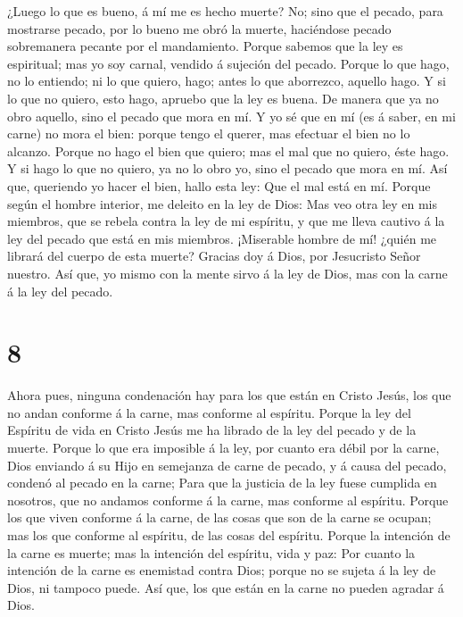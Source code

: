  ¿Luego lo que es bueno, á mí me es hecho muerte? No; sino
que el pecado, para mostrarse pecado, por lo bueno me obró la muerte,
haciéndose pecado sobremanera pecante por el mandamiento. 
Porque sabemos que la ley es espiritual; mas yo soy carnal, vendido á
sujeción del pecado.  Porque lo que hago, no lo entiendo;
ni lo que quiero, hago; antes lo que aborrezco, aquello hago.
 Y si lo que no quiero, esto hago, apruebo que la ley es
buena.  De manera que ya no obro aquello, sino el pecado
que mora en mí.  Y yo sé que en mí (es á saber, en mi
carne) no mora el bien: porque tengo el querer, mas efectuar el bien no
lo alcanzo.  Porque no hago el bien que quiero; mas el mal
que no quiero, éste hago.  Y si hago lo que no quiero, ya
no lo obro yo, sino el pecado que mora en mí.  Así que,
queriendo yo hacer el bien, hallo esta ley: Que el mal está en mí.
 Porque según el hombre interior, me deleito en la ley de
Dios:  Mas veo otra ley en mis miembros, que se rebela
contra la ley de mi espíritu, y que me lleva cautivo á la ley del pecado
que está en mis miembros.  ¡Miserable hombre de mí! ¿quién
me librará del cuerpo de esta muerte?  Gracias doy á Dios,
por Jesucristo Señor nuestro. Así que, yo mismo con la mente sirvo á la
ley de Dios, mas con la carne á la ley del pecado.

\hypertarget{section-7}{%
\section{8}\label{section-7}}

 Ahora pues, ninguna condenación hay para los que están en
Cristo Jesús, los que no andan conforme á la carne, mas conforme al
espíritu.  Porque la ley del Espíritu de vida en Cristo
Jesús me ha librado de la ley del pecado y de la muerte. 
Porque lo que era imposible á la ley, por cuanto era débil por la carne,
Dios enviando á su Hijo en semejanza de carne de pecado, y á causa del
pecado, condenó al pecado en la carne;  Para que la justicia
de la ley fuese cumplida en nosotros, que no andamos conforme á la
carne, mas conforme al espíritu.  Porque los que viven
conforme á la carne, de las cosas que son de la carne se ocupan; mas los
que conforme al espíritu, de las cosas del espíritu.  Porque
la intención de la carne es muerte; mas la intención del espíritu, vida
y paz:  Por cuanto la intención de la carne es enemistad
contra Dios; porque no se sujeta á la ley de Dios, ni tampoco puede.
 Así que, los que están en la carne no pueden agradar á
Dios.

